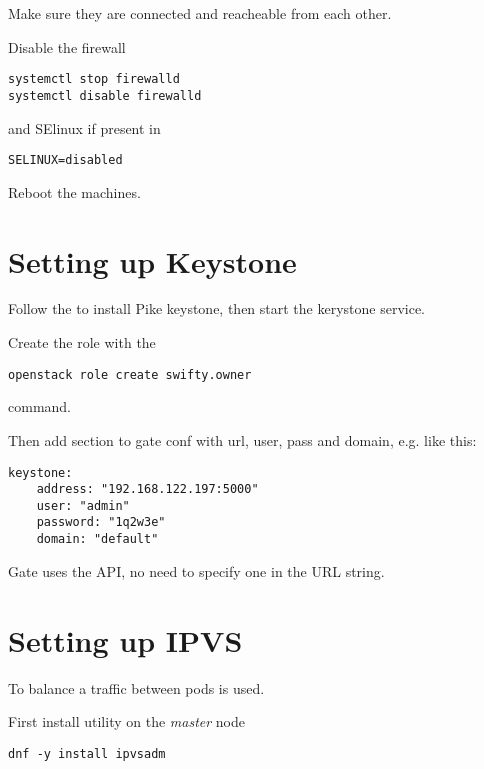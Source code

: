 Make sure they are connected and reacheable from each other.

Disable the firewall

\begin{lstlisting}
systemctl stop firewalld
systemctl disable firewalld
\end{lstlisting}

and SElinux if present in 

\begin{lstlisting}
SELINUX=disabled
\end{lstlisting}

Reboot the machines.

\section{Setting up Keystone}
\label{sec:setup-keystone}

Follow the
to install 
{Pike} keystone, then start the kerystone service.

Create the  role with the

\begin{lstlisting}
openstack role create swifty.owner
\end{lstlisting}

command.

Then add  section to gate conf with url, user, pass
and domain, e.g. like this:
\begin{lstlisting}
keystone:
	address: "192.168.122.197:5000"
	user: "admin"
	password: "1q2w3e"
	domain: "default"
\end{lstlisting}

Gate uses the  API, no need to specify one in the URL string.

\section{Setting up IPVS}
\label{sec:setup-nfs}

To balance a traffic between pods
 is used.

First install  utility on the \emph{master} node

\begin{lstlisting}
dnf -y install ipvsadm
\end{lstlisting}

